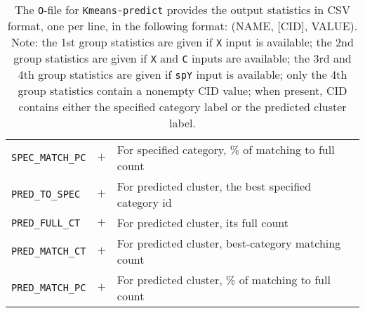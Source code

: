 \begin{table}[t]
{\begin{tabular}{|lcl|}
{\tt SPEC\_MATCH\_PC} & $+$ & For specified category, \% of matching to full count \\
{\tt PRED\_TO\_SPEC}  & $+$ & For predicted cluster, the best specified category id \\
{\tt PRED\_FULL\_CT}  & $+$ & For predicted cluster, its full count \\
{\tt PRED\_MATCH\_CT} & $+$ & For predicted cluster, best-category matching count \\
{\tt PRED\_MATCH\_PC} & $+$ & For predicted cluster, \% of matching to full count \\
\hline
\end{tabular}}
\caption{The {\tt O}-file for {\tt Kmeans-predict} provides the output statistics
in CSV format, one per line, in the following format: (NAME, [CID], VALUE).  Note:
the 1st group statistics are given if {\tt X} input is available;
the 2nd group statistics are given if {\tt X} and {\tt C} inputs are available;
the 3rd and 4th group statistics are given if {\tt spY} input is available;
only the 4th group statistics contain a nonempty CID value;
when present, CID contains either the specified category label or the
predicted cluster label.}
\label{table:kmeans:predict:stats}
\end{table}


\smallskip

